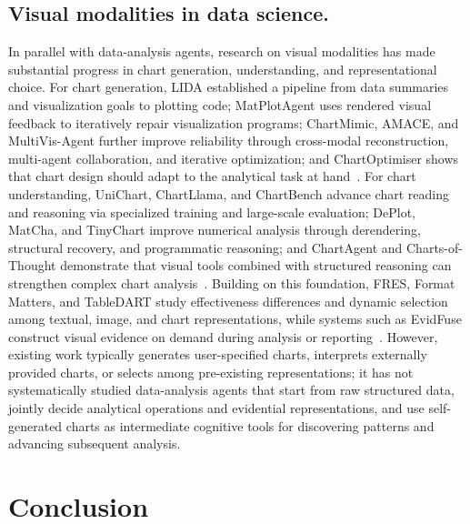 \documentclass{article}
\begin{document}
\subsection{Visual modalities in data science.}
In parallel with data-analysis agents, research on visual modalities has made substantial progress in chart generation, understanding, and representational choice.
For chart generation, LIDA established a pipeline from data summaries and visualization goals to plotting code; MatPlotAgent uses rendered visual feedback to iteratively repair visualization programs; ChartMimic, AMACE, and MultiVis-Agent further improve reliability through cross-modal reconstruction, multi-agent collaboration, and iterative optimization; and ChartOptimiser shows that chart design should adapt to the analytical task at hand~\citep{dibia2023lida,yang2024matplotagent,yang2025chartmimic,namgoong2025amace,lu2026multivisagent,wang2025chartoptimiser}.
For chart understanding, UniChart, ChartLlama, and ChartBench advance chart reading and reasoning via specialized training and large-scale evaluation; DePlot, MatCha, and TinyChart improve numerical analysis through derendering, structural recovery, and programmatic reasoning; and ChartAgent and Charts-of-Thought demonstrate that visual tools combined with structured reasoning can strengthen complex chart analysis~\citep{masry2023unichart,han2023chartllama,xu2023chartbench,liu2023deplot,liu2023matcha,zhang2024tinychart,kaur2026chartagent,das2025chartsofthought}.
Building on this foundation, FRES, Format Matters, and TableDART study effectiveness differences and dynamic selection among textual, image, and chart representations, while systems such as EvidFuse construct visual evidence on demand during analysis or reporting~\citep{zhou2025fres,ho2026formatmatters,xing2026tabledart,lin2026evidfuse}.
However, existing work typically generates user-specified charts, interprets externally provided charts, or selects among pre-existing representations; it has not systematically studied data-analysis agents that start from raw structured data, jointly decide analytical operations and evidential representations, and use self-generated charts as intermediate cognitive tools for discovering patterns and advancing subsequent analysis.

\section{Conclusion}
\label{sec:conclusion}
\end{document}
